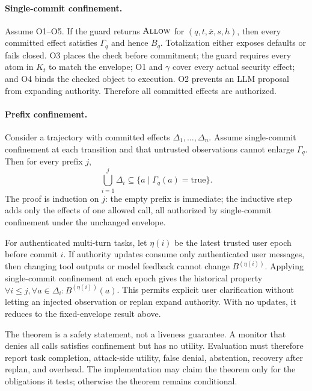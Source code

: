 \documentclass[letterpaper,twocolumn,10pt]{article}
\newcommand{\Allow}{\textsc{Allow}}
\begin{document}
\paragraph{Single-commit confinement.}
Assume O1--O5. If the guard returns $\Allow$ for $(q,t,\bar{x},s,h)$, then every committed effect satisfies $\Gamma_q$ and hence $B_q$. Totalization either exposes defaults or fails closed. O3 places the check before commitment; the guard requires every atom in $K_t$ to match the envelope; O1 and $\gamma$ cover every actual security effect; and O4 binds the checked object to execution. O2 prevents an LLM proposal from expanding authority. Therefore all committed effects are authorized.

\paragraph{Prefix confinement.}
Consider a trajectory with committed effects $\Delta_1,\ldots,\Delta_n$. Assume single-commit confinement at each transition and that untrusted observations cannot enlarge $\Gamma_q$. Then for every prefix $j$,
\[
  \bigcup_{i=1}^{j}\Delta_i
  \subseteq \{a\mid\Gamma_q(a)=\mathrm{true}\}.
\]
The proof is induction on $j$: the empty prefix is immediate; the inductive step adds only the effects of one allowed call, all authorized by single-commit confinement under the unchanged envelope.

For authenticated multi-turn tasks, let $\eta(i)$ be the latest trusted user epoch before commit $i$. If authority updates consume only authenticated user messages, then changing tool outputs or model feedback cannot change $B^{(\eta(i))}$. Applying single-commit confinement at each epoch gives the historical property $\forall i\leq j,\forall a\in\Delta_i:B^{(\eta(i))}(a)$. This permits explicit user clarification without letting an injected observation or replan expand authority. With no updates, it reduces to the fixed-envelope result above.

The theorem is a safety statement, not a liveness guarantee. A monitor that denies all calls satisfies confinement but has no utility. Evaluation must therefore report task completion, attack-side utility, false denial, abstention, recovery after replan, and overhead. The implementation may claim the theorem only for the obligations it tests; otherwise the theorem remains conditional.
\end{document}
